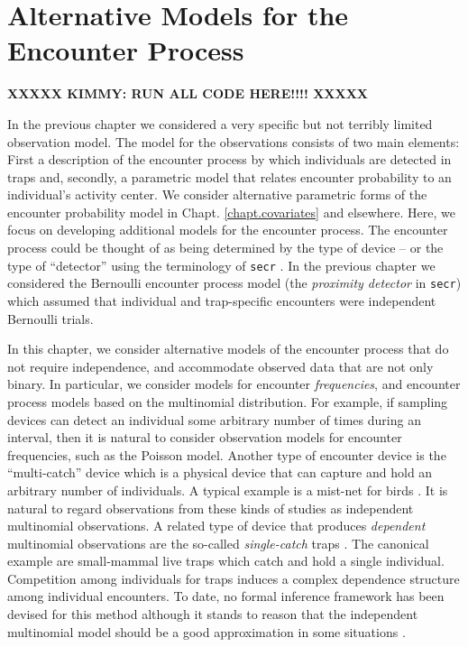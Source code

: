 \chapter{Alternative Models for the Encounter Process}
\label{chapt.poisson-mn}

\vspace{.3in}

{\bf XXXXX KIMMY: RUN ALL CODE HERE!!!! XXXXX}

In the previous chapter we considered a very specific but not terribly
limited observation model. The model for the observations consists of
two main
elements: First a description of the encounter process by which
individuals are detected in traps and, secondly, a parametric model
that relates encounter probability to an individual's activity
center.  We consider 
alternative parametric forms of 
the encounter probability model in
Chapt. \ref{chapt.covariates} and elsewhere.
Here, we focus on developing additional models for the encounter
process. 
The encounter process could be thought of as being determined by the
type of device -- or the type of ``detector'' using the terminology of
\mbox{\tt secr} \citep{efford:2011}.
In the previous chapter we considered the Bernoulli encounter process
model (the {\it proximity detector} in \mbox{\tt secr}) which assumed that individual and 
trap-specific encounters were independent Bernoulli trials. 

In this chapter, we consider alternative models of the encounter
process that do not require independence, and accommodate observed
data that are not only binary. 
In particular, we consider models for encounter {\it frequencies},
and 
encounter process models based on the multinomial 
distribution. For example, if
sampling devices can detect an individual some arbitrary number of
times during an interval, then it is natural to consider observation
models for encounter frequencies, such as the Poisson model. Another
type of encounter device is the ``multi-catch'' device
\citep{efford_etal:2009euring} which
is a physical device that can capture and hold an arbitrary number of
individuals. A typical example is a mist-net for birds
\citep{borchers_efford:2008}.  It is natural to regard observations
from these kinds of studies as independent multinomial observations.
A related type of device that produces {\it dependent} multinomial
observations are the so-called {\it single-catch} traps
\citep{efford:2004, efford_etal:2009euring}. The canonical example are small-mammal
live traps \citep{converse_etal:2006ea} which catch and hold a single individual. Competition
among individuals for traps induces a complex dependence structure
among individual encounters. To date, no formal inference framework
has been devised for this method although it stands to reason that the
independent multinomial model should be a good approximation in some
situations \citep{efford_etal:2009euring}.  

